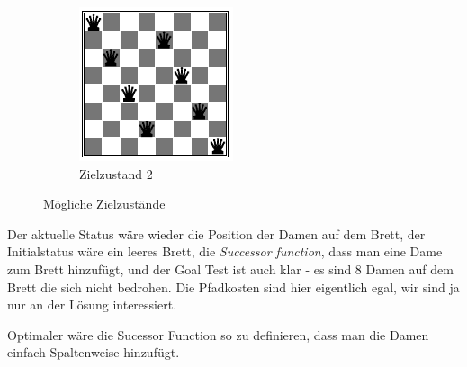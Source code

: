 \begin{figure}[h!]
\begin{subfigure}[h]{0.2\textwidth}
	\includegraphics[width=\textwidth]{fig/8_queens_start}
		\caption{Zielzustand 2}
	\end{subfigure}
	\caption{Mögliche Zielzustände}
\end{figure} 

Der aktuelle Status wäre wieder die Position der Damen auf dem Brett, der Initialstatus wäre ein leeres Brett, die \textit{Successor function}, dass man eine Dame zum Brett hinzufügt, und der Goal Test ist auch klar - es sind 8 Damen auf dem Brett die sich nicht bedrohen. Die Pfadkosten sind hier eigentlich egal, wir sind ja nur an der Lösung interessiert.

Optimaler wäre die Sucessor Function so zu definieren, dass man die Damen einfach Spaltenweise hinzufügt.

